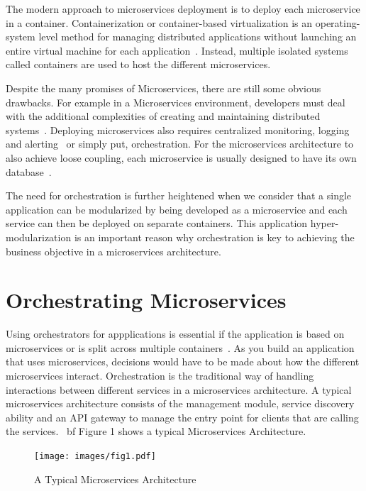 The modern approach to microservices deployment is to deploy each
microservice in a container. Containerization or container-based
virtualization is an operating-system level method for managing 
distributed applications without launching an entire virtual
machine for each application~\cite{hid-sp18-501-techtarget}. Instead,
multiple isolated systems called containers are used to host the
different microservices.

Despite the many promises of Microservices, there are still some
obvious drawbacks. For example in a Microservices environment,
developers must deal with the additional complexities of creating and
maintaining distributed
systems~\cite{hid-sp18-501-patterns}. Deploying microservices also
requires centralized monitoring, logging and
alerting~\cite{hid-sp18-501-challenges} or simply put,
orchestration. For the microservices architecture to also achieve
loose coupling, each microservice is usually designed to have its own
database~\cite{hid-sp18-501-patterns}.

The need for orchestration is further heightened when we consider that
a single application can be modularized by being developed as a
microservice and each service can then be deployed on separate
containers. This application hyper-modularization is an important
reason why orchestration is key to achieving the business objective in
a microservices architecture.


\section{Orchestrating Microservices}
Using orchestrators for appplications is essential if the application
is based on microservices or is split across multiple
containers~\cite{hid-sp18-501-dotnet}. As you build an application
that uses microservices, decisions would have to be made about how the
different microservices interact. Orchestration is the traditional way
of handling interactions between different services in a microservices
architecture. A typical microservices architecture consists of the
management module, service discovery ability and an API gateway to
manage the entry point for clients that are calling the services. {\
bf Figure 1}
shows a typical Microservices Architecture.

\begin{figure}[!ht]
  \centering\texttt{[image: images/fig1.pdf]}
  \caption{A Typical Microservices Architecture~\cite{hid-sp18-501-fig1}}
\label{f:architecture}
\end{figure}

